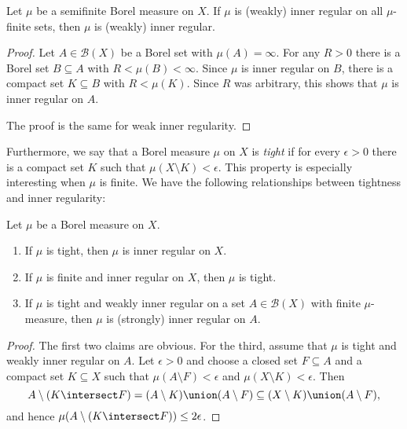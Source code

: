 \documentclass[article, a4paper, 11pt, oneside]{memoir}
\numberwithin{equation}{chapter}
\newcommand{\calB}{\mathcal{B}}
\newcommand{\borel}[1]{\calB(#1)}
\begin{document}
\begin{lemma}
    \label{lem:semifinite-inner-regular-condition}
    Let $\mu$ be a semifinite Borel measure on $X$. If $\mu$ is (weakly) inner regular on all $\mu$-finite sets, then $\mu$ is (weakly) inner regular.
\end{lemma}

\begin{proof}
    Let $A \in \borel{X}$ be a Borel set with $\mu(A) = \infty$. For any $R > 0$ there is a Borel set $B \subseteq A$ with $R < \mu(B) < \infty$. Since $\mu$ is inner regular on $B$, there is a compact set $K \subseteq B$ with $R < \mu(K)$. Since $R$ was arbitrary, this shows that $\mu$ is inner regular on $A$.

    The proof is the same for weak inner regularity.
\end{proof}


Furthermore, we say that a Borel measure $\mu$ on $X$ is \emph{tight} if for every $\epsilon > 0$ there is a compact set $K$ such that $\mu(X \setminus K) < \epsilon$. This property is especially interesting when $\mu$ is finite. We have the following relationships between tightness and inner regularity:

\begin{lemma}
    \label{lem:tightness-vs-inner-regularity}
    Let $\mu$ be a Borel measure on $X$.
    \begin{enumerate}
        \item If $\mu$ is tight, then $\mu$ is inner regular on $X$.
        \item If $\mu$ is finite and inner regular on $X$, then $\mu$ is tight.
        \item If $\mu$ is tight and weakly inner regular on a set $A \in \borel{X}$ with finite $\mu$-measure, then $\mu$ is (strongly) inner regular on $A$.
    \end{enumerate}
\end{lemma}

\begin{proof}
    The first two claims are obvious. For the third, assume that $\mu$ is tight and weakly inner regular on $A$. Let $\epsilon > 0$ and choose a closed set $F \subseteq A$ and a compact set $K \subseteq X$ such that $\mu(A \setminus F) < \epsilon$ and $\mu(X \setminus K) < \epsilon$. Then
    \begin{equation*}
        A \setminus (K \intersect F)
            = (A \setminus K) \union (A \setminus F)
            \subseteq (X \setminus K) \union (A \setminus F),
    \end{equation*}
    and hence $\mu(A \setminus (K \intersect F)) \leq 2\epsilon$.
\end{proof}
\end{document}
